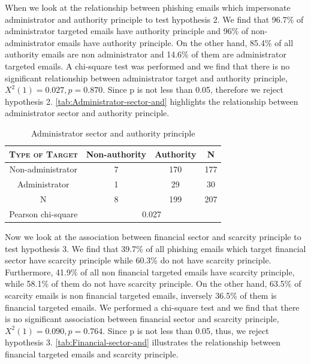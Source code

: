 When we look at the relationship between phishing emails which impersonate
administrator and authority principle to test hypothesis 2. We find
that 96.7\% of administrator targeted emails have authority principle
and 96\% of non-administrator emails have authority principle. On
the other hand, 85.4\% of all authority emails are non administrator
and 14.6\% of them are administrator targeted emails. A chi-square
test was performed and we find that there is no significant relationship
between administrator target and authority principle, $X^{2}(1)=0.027,p=0.870$.
Since p is not less than 0.05, therefore we reject hypothesis 2. \autoref{tab:Administrator-sector-and}
highlights the relationship between administrator sector and authority
principle.

\begin{minipage}[t]{1\columnwidth}%
\begin{longtable}{cccc}
\caption{\label{tab:Administrator-sector-and}Administrator sector and authority
principle }
\tabularnewline
\toprule 
\textsc{\footnotesize{}Type of Target} & {\footnotesize{}Non-authority} & {\footnotesize{}Authority} & \multirow{1}{*}{{\footnotesize{}N}}\tabularnewline
\midrule 
\multirow{1}{*}{{\footnotesize{}Non-administrator}} & {\footnotesize{}7} & {\footnotesize{}170} & \multirow{1}{*}{{\footnotesize{}177}}\tabularnewline
\midrule 
\multirow{1}{*}{{\footnotesize{}Administrator}} & {\footnotesize{}1} & {\footnotesize{}29} & \multirow{1}{*}{{\footnotesize{}30}}\tabularnewline
\midrule
\midrule 
{\footnotesize{}N} & {\footnotesize{}8} & {\footnotesize{}199} & {\footnotesize{}207}\tabularnewline
\midrule
\midrule 
{\footnotesize{}Pearson chi-square} & \multicolumn{3}{c}{{\footnotesize{}0.027}}\tabularnewline
\midrule
\end{longtable}%
\end{minipage}

Now we look at the association between financial sector and scarcity
principle to test hypothesis 3. We find that 39.7\% of all phishing
emails which target financial sector have scarcity principle while
60.3\% do not have scarcity principle. Furthermore, 41.9\% of all
non financial targeted emails have scarcity principle, while 58.1\%
of them do not have scarcity principle. On the other hand, 63.5\%
of scarcity emails is non financial targeted emails, inversely 36.5\%
of them is financial targeted emails. We performed a chi-square test
and we find that there is no significant association between financial
sector and scarcity principle, $X^{2}(1)=0.090,p=0.764$. Since p
is not less than 0.05, thus, we reject hypothesis 3. \autoref{tab:Financial-sector-and}
illustrates the relationship between financial targeted emails and
scarcity principle.

